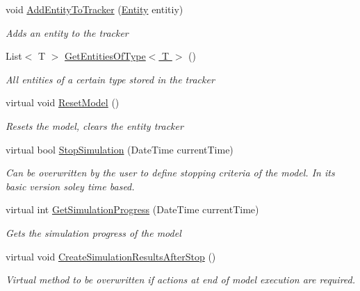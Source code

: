 \begin{DoxyCompactItemize}
void \hyperlink{class_simulation_core_1_1_simulation_classes_1_1_simulation_model_ab30206e46d6ba192929b83cf57517d35}{Add\+Entity\+To\+Tracker} (\hyperlink{class_simulation_core_1_1_h_c_c_m_elements_1_1_entity}{Entity} entitiy)
\begin{DoxyCompactList}\small\item\em Adds an entity to the tracker \end{DoxyCompactList}\item 
List$<$ T $>$ \hyperlink{class_simulation_core_1_1_simulation_classes_1_1_simulation_model_ac99ae28719e0c936605167dfd13d37ee}{Get\+Entities\+Of\+Type$<$ T $>$} ()
\begin{DoxyCompactList}\small\item\em All entities of a certain type stored in the tracker \end{DoxyCompactList}\item 
virtual void \hyperlink{class_simulation_core_1_1_simulation_classes_1_1_simulation_model_a537e8d1e1821cc8de7731a77ef83f6a9}{Reset\+Model} ()
\begin{DoxyCompactList}\small\item\em Resets the model, clears the entity tracker \end{DoxyCompactList}\item 
virtual bool \hyperlink{class_simulation_core_1_1_simulation_classes_1_1_simulation_model_a4e4ed8deb3819b83fc2f924bdcb62d2f}{Stop\+Simulation} (Date\+Time current\+Time)
\begin{DoxyCompactList}\small\item\em Can be overwritten by the user to define stopping criteria of the model. In its basic version soley time based. \end{DoxyCompactList}\item 
virtual int \hyperlink{class_simulation_core_1_1_simulation_classes_1_1_simulation_model_a5b8da0da23916e1844a05ba51d8a5b1f}{Get\+Simulation\+Progress} (Date\+Time current\+Time)
\begin{DoxyCompactList}\small\item\em Gets the simulation progress of the model \end{DoxyCompactList}\item 
virtual void \hyperlink{class_simulation_core_1_1_simulation_classes_1_1_simulation_model_af7d12ffd75328aa67f615408821159f2}{Create\+Simulation\+Results\+After\+Stop} ()
\begin{DoxyCompactList}\small\item\em Virtual method to be overwritten if actions at end of model execution are required. \end{DoxyCompactList}\item 

\end{DoxyCompactItemize}
